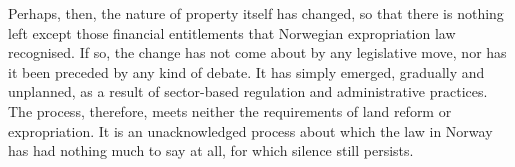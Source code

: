 Perhaps, then, the nature of property itself has changed, so that there is nothing left except those financial entitlements that Norwegian expropriation law recognised. If so, the change has not come about by any legislative move, nor has it been preceded by any kind of debate. It has simply emerged, gradually and unplanned, as a result of sector-based regulation and administrative practices. The process, therefore, meets neither the requirements of land reform or expropriation. It is an unacknowledged process about which the law in Norway has had nothing much to say at all, for which silence still persists. 



